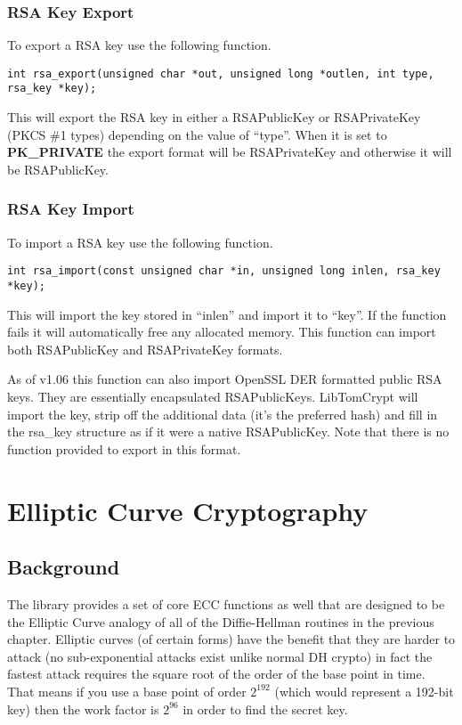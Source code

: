 \documentclass[a4paper]{book}
\begin{document}
\subsection{RSA Key Export}
To export a RSA key use the following function.

\begin{verbatim}
int rsa_export(unsigned char *out, unsigned long *outlen, int type, rsa_key *key);
\end{verbatim}
This will export the RSA key in either a RSAPublicKey or RSAPrivateKey (PKCS \#1 types) depending on the value of ``type''.  When it is 
set to \textbf{PK\_PRIVATE} the export format will be RSAPrivateKey and otherwise it will be RSAPublicKey.

\subsection{RSA Key Import}
To import a RSA key use the following function.

\begin{verbatim}
int rsa_import(const unsigned char *in, unsigned long inlen, rsa_key *key);
\end{verbatim}

This will import the key stored in ``inlen'' and import it to ``key''.  If the function fails it will automatically free any allocated memory.  This
function can import both RSAPublicKey and RSAPrivateKey formats.

As of v1.06 this function can also import OpenSSL DER formatted public RSA keys.  They are essentially encapsulated RSAPublicKeys.  LibTomCrypt will
import the key, strip off the additional data (it's the preferred hash) and fill in the rsa\_key structure as if it were a native RSAPublicKey.  Note that
there is no function provided to export in this format.  

\chapter{Elliptic Curve Cryptography}

\section{Background}
The library provides a set of core ECC functions as well that are designed to be the Elliptic Curve analogy of all of the 
Diffie-Hellman routines in the previous chapter.  Elliptic curves (of certain forms) have the benefit that they are harder
to attack (no sub-exponential attacks exist unlike normal DH crypto) in fact the fastest attack requires the square root
of the order of the base point in time.  That means if you use a base point of order $2^{192}$ (which would represent a
192-bit key) then the work factor is $2^{96}$ in order to find the secret key.
\end{document}
